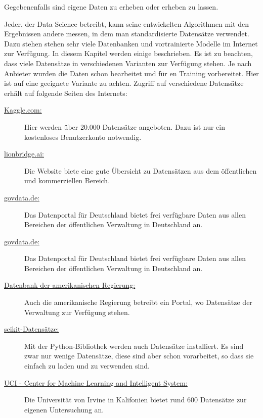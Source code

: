 {Gegebenenfalls sind eigene Daten zu erheben oder erheben zu lassen.

Jeder, der Data Science betreibt, kann seine entwickelten Algorithmen mit den Ergebnissen andere messen, in dem man standardisierte Datensätze verwendet. Dazu stehen stehen sehr viele Datenbanken und vortrainierte Modelle im Internet zur Verfügung. In diesem Kapitel werden einige beschrieben. Es ist zu beachten, dass viele Datensätze in verschiedenen Varianten zur Verfügung stehen. Je nach Anbieter wurden die Daten schon bearbeitet und für en Training vorbereitet. Hier ist auf eine geeignete Variante zu achten. Zugriff auf verschiedene Datensätze erhält auf folgende Seiten des Internets:


\begin{description}
  \item [\href{https://www.kaggle.com/datasets}{Kaggle.com:}] Hier werden über 20.000 Datensätze angeboten. Dazu ist nur ein kostenloses Benutzerkonto notwendig.
  
  \item [\href{https://lionbridge.ai/datasets/the-50-best-free-datasets-for-machine-learning/}{lionbridge.ai:}]  Die Website biete eine gute Übersicht zu Datensätzen aus dem öffentlichen und kommerziellen Bereich.
  
  \item [\href{govdata.de}{govdata.de:}] Das Datenportal für Deutschland bietet frei verfügbare Daten aus allen Bereichen der öffentlichen Verwaltung in Deutschland an.

  \item [\href{govdata.de}{govdata.de:}] Das Datenportal für Deutschland bietet frei verfügbare Daten aus allen Bereichen der öffentlichen Verwaltung in Deutschland an.

  \item [\href{https://www.data.gov}{Datenbank der amerikanischen Regierung:}] Auch die amerikanische Regierung betreibt ein Portal, wo Datensätze der Verwaltung zur Verfügung stehen.
  
  \item [\href{https://riptutorial.com/de/scikit-learn/example/6801/beispieldatensatze}{scikit-Datensätze:}] Mit der Python-Bibliothek werden auch Datensätze installiert. Es sind zwar nur wenige Datensätze, diese sind aber schon vorarbeitet, so dass sie einfach zu laden und zu verwenden sind.

  \item [\href{https://archive.ics.uci.edu/ml/datasets.php}{UCI - Center for Machine Learning and Intelligent System:}] Die Universität von Irvine in  Kalifonien bietet rund 600 Datensätze zur eigenen Untersuchung an.
  

\end{description}}
